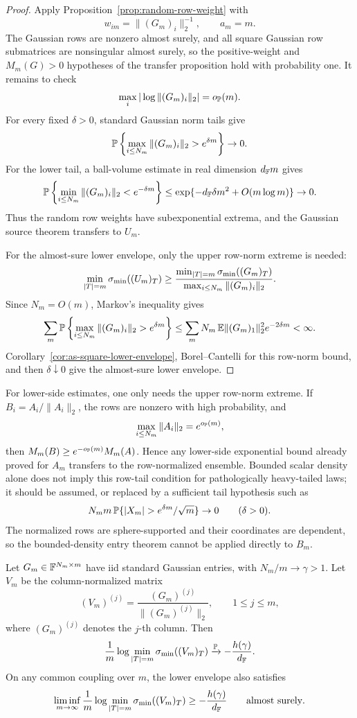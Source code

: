 \begin{proof}
Apply Proposition~\ref{prop:random-row-weight} with
\[
  w_{im}=\|(G_m)_i\|_2^{-1},\qquad a_m=m.
\]
The Gaussian rows are nonzero almost surely, and all square Gaussian row
submatrices are nonsingular almost surely, so the positive-weight and
\(M_m(G)>0\) hypotheses of the transfer proposition hold with probability one.
It remains to check
\[
  \max_i|\log\|(G_m)_i\|_2|=o_{\mathbb{P}}(m).
\]
For every fixed \(\delta>0\), standard Gaussian norm tails give
\[
  \mathbb{P}\left\{\max_{i\le N_m}\|(G_m)_i\|_2>e^{\delta m}\right\}\to0.
\]
For the lower tail, a ball-volume estimate in real dimension \(d_{\mathbb{F}} m\) gives
\[
  \mathbb{P}\left\{\min_{i\le N_m}\|(G_m)_i\|_2<e^{-\delta m}\right\}
  \le \exp\{-d_{\mathbb{F}}\delta m^2+O(m\log m)\}\to0.
\]
Thus the random row weights have subexponential extrema, and the Gaussian
source theorem transfers to \(U_m\).

For the almost-sure lower envelope, only the upper row-norm extreme is needed:
\[
  \min_{|T|=m}\sigma_{\min}((U_m)_T)
  \ge
  \frac{\min_{|T|=m}\sigma_{\min}((G_m)_T)}
       {\max_{i\le N_m}\|(G_m)_i\|_2}.
\]
Since \(N_m=O(m)\), Markov's inequality gives
\[
  \sum_m
  \mathbb{P}\left\{\max_{i\le N_m}\|(G_m)_i\|_2>e^{\delta m}\right\}
  \le
  \sum_m N_m\,\mathbb{E}\|(G_m)_1\|_2^2 e^{-2\delta m}<\infty .
\]
Corollary~\ref{cor:as-square-lower-envelope}, Borel--Cantelli for this
row-norm bound, and then \(\delta\downarrow0\) give the almost-sure lower
envelope.
\end{proof}

\begin{remark}
For lower-side estimates, one only needs the upper row-norm extreme.  If
\(B_i=A_i/\|A_i\|_2\), the rows are nonzero with high probability, and
\[
  \max_{i\le N_m}\|A_i\|_2=e^{o_{\mathbb{P}}(m)},
\]
then \(M_m(B)\ge e^{-o_{\mathbb{P}}(m)}M_m(A)\).  Hence any lower-side exponential
bound already proved for \(A_m\) transfers to the row-normalized ensemble.
Bounded scalar density alone does not imply this row-tail condition for
pathologically heavy-tailed laws; it should be assumed, or replaced by a
sufficient tail hypothesis such as
\[
  N_m m\,\PP\{|X_m|>e^{\delta m}/\sqrt m\}\to0
  \qquad(\delta>0).
\]
The normalized rows are sphere-supported and their coordinates are dependent,
so the bounded-density entry theorem cannot be applied directly to \(B_m\).
\end{remark}

\begin{corollary}\label{cor:column-normalized-gaussian}
Let \(G_m\in\mathbb{F}^{N_m\times m}\) have iid standard Gaussian entries, with
\(N_m/m\to\gamma>1\).  Let \(V_m\) be the column-normalized matrix
\[
  (V_m)^{(j)}=\frac{(G_m)^{(j)}}{\|(G_m)^{(j)}\|_2},
  \qquad 1\le j\le m,
\]
where \((G_m)^{(j)}\) denotes the \(j\)-th column.  Then
\[
  \frac1m\log\min_{|T|=m}\sigma_{\min}((V_m)_T)
  \xrightarrow{\mathbb{P}}-\frac{h(\gamma)}{d_{\mathbb{F}}}.
\]
On any common coupling over \(m\), the lower envelope also satisfies
\[
  \liminf_{m\to\infty}\frac1m\log\min_{|T|=m}\sigma_{\min}((V_m)_T)
  \ge -\frac{h(\gamma)}{d_{\mathbb{F}}}
  \qquad\hbox{almost surely}.
\]
\end{corollary}

